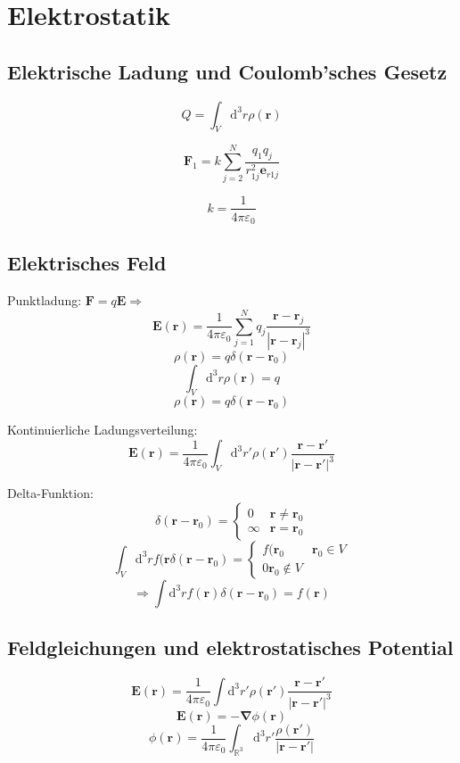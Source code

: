 \documentclass[titlepage,11pt,a4paper,ngerman]{report}
\newcommand{\dd}{\mathrm{d}}
\renewcommand{\vec}[1]{\bm{#1}}
\renewcommand{\epsilon}{\varepsilon}
\newcommand{\vabla}{\vec{\nabla}}
\newcommand{\vepsilon}{\varepsilon}
\begin{document}
\section{Elektrostatik}

\subsection{Elektrische Ladung und Coulomb'sches Gesetz}

\[Q=\int_V\dd^3r\rho(\vec{r})\]

\[\vec{F}_1=k\sum_{j=2}^N\frac{q_1q_j}{r^2_{1j}\vec{e}_{r1j}}\]

\[k=\frac{1}{4\pi\vepsilon_0}\]

\subsection{Elektrisches Feld}

Punktladung:
$\vec{F}=q\vec{E}\Rightarrow$
\[\vec{E}(\vec{r})=\frac{1}{4\pi\vepsilon_0}\sum_{j=1}^Nq_j\frac{\vec{r}-\vec{r}_j}{|\vec{r}-\vec{r}_j|^3}\]
\[\rho(\vec{r})=q\delta(\vec{r}-\vec{r}_0)\]
\[\int_V\dd^3r\rho(\vec{r})=q\]
\[\rho(\vec{r})=q\delta(\vec{r}-\vec{r}_0)\]

Kontinuierliche Ladungsverteilung:
\[\vec{E}(\vec{r})=\frac{1}{4\pi\vepsilon_0}\int_V\dd^3r'\rho(\vec{r}')\frac{\vec{r}-\vec{r}'}{|\vec{r}-\vec{r}'|^3}\]

Delta-Funktion:
\[\delta(\vec{r}-\vec{r}_0)=\begin{cases}0&\vec{r}\neq\vec{r}_0\\\infty&\vec{r}=\vec{r}_0\end{cases}\]
\[\int_V\dd^3rf(\vec{r}\delta(\vec{r}-\vec{r}_0)=\begin{cases}f(\vec{r}_0&\vec{r}_0\in V\\0\vec{r}_0\notin V\end{cases}\]
\[\Rightarrow\int\dd^3rf(\vec{r})\delta(\vec{r}-\vec{r}_0)=f(\vec{r})\]

\subsection{Feldgleichungen und elektrostatisches Potential}
\[\vec{E}(\vec{r})=\frac{1}{4\pi\epsilon_0}\int\dd^3r'\rho(\vec{r}')\frac{\vec{r}-\vec{r}'}{|\vec{r}-\vec{r}'|^3}\]
\[\vec{E}(\vec{r})=-\vabla\phi(\vec{r})\]
\[\phi(\vec{r})=\frac{1}{4\pi\epsilon_0}\int_{\mathbb{R}^3}\dd^3r'\frac{\rho(\vec{r}')}{|\vec{r}-\vec{r}'|}\]

\end{document}
